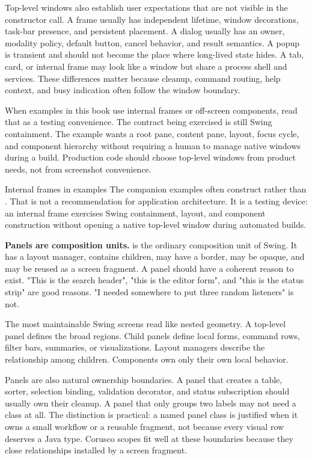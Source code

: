 Top-level windows also establish user expectations that are not visible in the constructor call. A frame usually has independent lifetime, window decorations, task-bar presence, and persistent placement. A dialog usually has an owner, modality policy, default button, cancel behavior, and result semantics. A popup is transient and should not become the place where long-lived state hides. A tab, card, or internal frame may look like a window but share a process shell and services. These differences matter because cleanup, command routing, help context, and busy indication often follow the window boundary.

When examples in this book use internal frames or off-screen components, read that as a testing convenience. The contract being exercised is still Swing containment. The example wants a root pane, content pane, layout, focus cycle, and component hierarchy without requiring a human to manage native windows during a build. Production code should choose top-level windows from product needs, not from screenshot convenience.

\begin{detailbox}{Internal frames in examples}
The companion examples often construct  rather than . That is not a recommendation for application architecture. It is a testing device: an internal frame exercises Swing containment, layout, and component construction without opening a native top-level window during automated builds.
\end{detailbox}

\textbf{Panels are composition units.}  is the ordinary composition unit of Swing. It has a layout manager, contains children, may have a border, may be opaque, and may be reused as a screen fragment. A panel should have a coherent reason to exist. "This is the search header", "this is the editor form", and "this is the status strip" are good reasons. "I needed somewhere to put three random listeners" is not.

The most maintainable Swing screens read like nested geometry. A top-level panel defines the broad regions. Child panels define local forms, command rows, filter bars, summaries, or visualizations. Layout managers describe the relationship among children. Components own only their own local behavior.

Panels are also natural ownership boundaries. A panel that creates a table, sorter, selection binding, validation decorator, and status subscription should usually own their cleanup. A panel that only groups two labels may not need a class at all. The distinction is practical: a named panel class is justified when it owns a small workflow or a reusable fragment, not because every visual row deserves a Java type. Corusco scopes fit well at these boundaries because they close relationships installed by a screen fragment.

